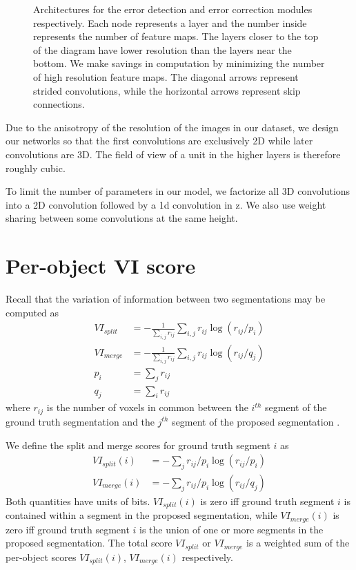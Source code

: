 \documentclass{article}
\begin{document}
\begin{appendices}
\begin{figure}
\caption{Architectures for the error detection and error correction modules respectively. Each node represents a layer and the number inside represents the number of feature maps. The layers closer to the top of the diagram have lower resolution than the layers near the bottom. We make savings in computation by minimizing the number of high resolution feature maps. The diagonal arrows represent strided convolutions, while the horizontal arrows represent skip connections.}
\label{fig:architecture}
\end{figure}

Due to the anisotropy of the resolution of the images in our dataset, we design our networks so that the first convolutions are exclusively 2D while later convolutions are 3D. The field of view of a unit in the higher layers is therefore roughly cubic.

To limit the number of parameters in our model, we factorize all 3D convolutions into a 2D convolution followed by a 1d convolution in z. We also use weight sharing between some convolutions at the same height.

\section{Per-object VI score}
\label{appendix:vi}
 Recall that the variation of information between two segmentations may be computed as
\begin{align*}
	VI_{split}&=-\frac 1 {\sum_{i,j} r_{ij}} \sum_{i,j} r_{ij} \log(r_{ij}/p_i)\\
	VI_{merge}&=-\frac 1 {\sum_{i,j} r_{ij}} \sum_{i,j} r_{ij} \log(r_{ij}/q_j)\\
	p_i&=\sum_j r_{ij}\\
	q_j&=\sum_i r_{ij}
\end{align*}
where $r_{ij}$ is the number of voxels in common between the $i^{th}$ segment of the ground truth segmentation and the $j^{th}$ segment of the proposed segmentation \cite{vi}.

We define the split and merge scores for ground truth segment $i$ as
\begin{align*}
	VI_{split}(i) &= -\sum_j r_{ij}/p_i \log(r_{ij}/p_i)\\
	VI_{merge}(i) &= -\sum_j r_{ij}/p_i \log(r_{ij}/q_j)
\end{align*}
Both quantities have units of bits. $VI_{split}(i)$ is zero iff ground truth segment $i$ is contained within a segment in the proposed segmentation, while $VI_{merge}(i)$ is zero iff ground truth segment $i$ is the union of one or more segments in the proposed segmentation. The total score $VI_{split}$ or $VI_{merge}$ is a weighted sum of the per-object scores $VI_{split}(i)$, $VI_{merge}(i)$ respectively.



\end{appendices}
\end{document}
